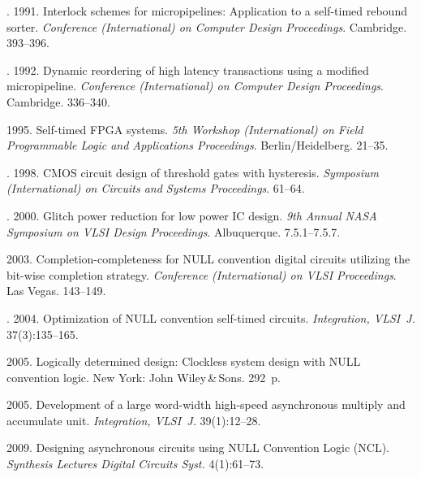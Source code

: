 \begin{multicols}{2}
{{\begin{thebibliography}{99}
. 1991. 
Interlock schemes for micropipelines: Application to a self-timed rebound sorter. 
\textit{Conference (International) on Computer Design Proceedings}.  Cambridge. 393--396.

. 1992. Dynamic reordering of high 
latency transactions using a modified micropipeline. 
\textit{Conference (International) on Computer Design Proceedings}. Cambridge. 336--340.

 1995. Self-timed FPGA systems. 
\textit{5th Workshop (International) on Field Programmable Logic and Applications Proceedings}.
Berlin/Heidelberg. 21--35.

. 1998. 
CMOS circuit design of threshold gates with hysteresis. 
\textit{Symposium (International) on Circuits and Systems Proceedings}. 61--64.

. 
2000. Glitch power reduction for low power IC design. 
\textit{9th Annual NASA Symposium on VLSI Design Proceedings}. Albuquerque. 7.5.1--7.5.7.

 2003.
Completion-completeness for NULL convention digital circuits utilizing the 
bit-wise completion strategy. \textit{Conference (International) on VLSI Proceedings}.
 Las Vegas. 143--149.

. 
2004. Optimization of NULL convention self-timed circuits. 
\textit{Integration, VLSI~J.} 37(3):135--165.

 2005. Logically determined design: 
Clockless system design with NULL convention logic. New York: John Wiley\,\&\,Sons. 292~p.

 2005. {Development of a large word-width high-speed asynchronous 
multiply and accumulate unit}. \textit{Integration, VLSI~J.} 39(1):12--28.

 2009. 
Designing asynchronous circuits using NULL Convention Logic (NCL). 
\textit{Synthesis Lectures Digital Circuits  Syst.} 4(1):61--73.



\end{thebibliography}}}
\end{multicols}
